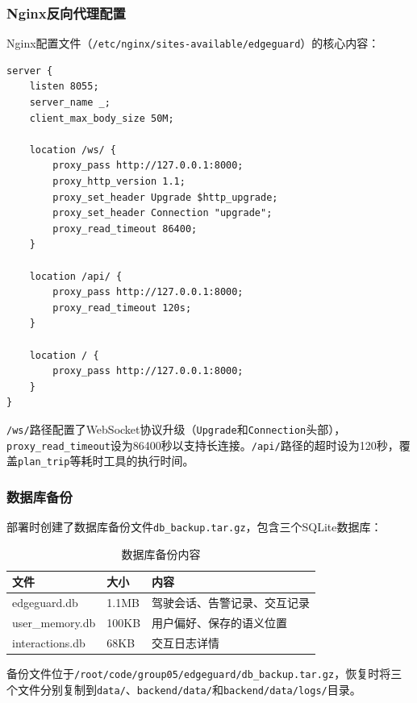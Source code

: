\documentclass[a4paper]{article}
\begin{document}
\subsubsection{Nginx反向代理配置}

Nginx配置文件（\texttt{/etc/nginx/sites-available/edgeguard}）的核心内容：

\begin{verbatim}
server {
    listen 8055;
    server_name _;
    client_max_body_size 50M;

    location /ws/ {
        proxy_pass http://127.0.0.1:8000;
        proxy_http_version 1.1;
        proxy_set_header Upgrade $http_upgrade;
        proxy_set_header Connection "upgrade";
        proxy_read_timeout 86400;
    }

    location /api/ {
        proxy_pass http://127.0.0.1:8000;
        proxy_read_timeout 120s;
    }

    location / {
        proxy_pass http://127.0.0.1:8000;
    }
}
\end{verbatim}

\texttt{/ws/}路径配置了WebSocket协议升级（\texttt{Upgrade}和\texttt{Connection}头部），\texttt{proxy\_read\_timeout}设为86400秒以支持长连接。\texttt{/api/}路径的超时设为120秒，覆盖\texttt{plan\_trip}等耗时工具的执行时间。

\subsubsection{数据库备份}

部署时创建了数据库备份文件\texttt{db\_backup.tar.gz}，包含三个SQLite数据库：

\begin{table}[H]
  \centering
  \caption{数据库备份内容}
  \label{tab:db_backup}
  \begin{tabular}{lll}
  \toprule
  文件 & 大小 & 内容 \\
  \midrule
  edgeguard.db & 1.1MB & 驾驶会话、告警记录、交互记录 \\
  user\_memory.db & 100KB & 用户偏好、保存的语义位置 \\
  interactions.db & 68KB & 交互日志详情 \\
  \bottomrule
  \end{tabular}
\end{table}

备份文件位于\texttt{/root/code/group05/edgeguard/db\_backup.tar.gz}，恢复时将三个文件分别复制到\texttt{data/}、\texttt{backend/data/}和\texttt{backend/data/logs/}目录。
\end{document}
